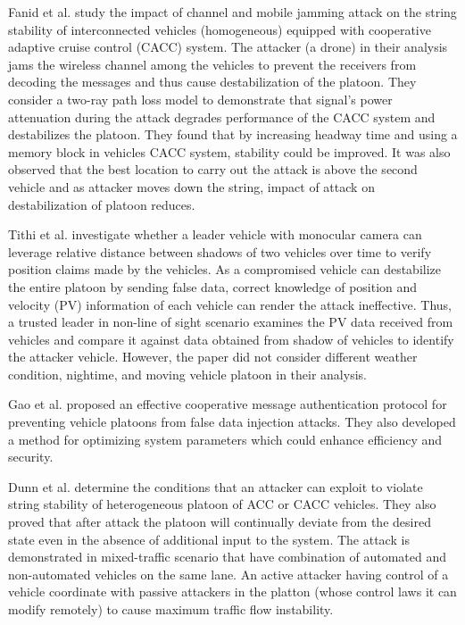 Fanid et al. \cite{FDZZ17} study the impact of channel and mobile jamming attack on the string stability of interconnected vehicles (homogeneous) equipped with  cooperative adaptive cruise control (CACC) system. The attacker (a drone) in their analysis jams the wireless channel among the vehicles to prevent the receivers from decoding the messages and thus cause destabilization of the platoon. They consider a two-ray path loss model to demonstrate that signal's power attenuation during the attack degrades performance of the CACC system and destabilizes the platoon. They found that by increasing headway time and using a memory block in vehicles CACC system, stability could be improved.  It was also observed that the best location to carry out the attack is above the second vehicle and as attacker moves down the string, impact of attack on destabilization of platoon reduces.  

Tithi et al. \cite{TWG17} investigate whether a leader vehicle with monocular camera can leverage relative distance between shadows of two vehicles over time to verify position claims made by the vehicles. As a compromised vehicle can destabilize the entire platoon by sending false data, correct knowledge of position and velocity (PV) information of each vehicle can render the attack ineffective. Thus, a trusted leader in non-line of sight scenario examines the PV data received from vehicles and compare it against data obtained from shadow of vehicles to identify the attacker vehicle. However, the paper did not consider different weather condition, nightime, and moving vehicle platoon in their analysis. 

Gao et al. \cite{GRZ16}  proposed an effective cooperative message authentication protocol for preventing vehicle platoons from false data injection attacks. They also developed a method for optimizing system parameters which could enhance efficiency and security. 

Dunn et al. \cite{DMSGSL17} determine the conditions that an attacker can exploit to violate string stability of heterogeneous platoon of ACC or CACC vehicles. They also proved that after attack the platoon will continually deviate from the desired state even in the absence of additional input to the system. The attack is demonstrated in mixed-traffic scenario that have combination of automated and non-automated vehicles on the same lane. An active attacker having control of a vehicle coordinate with passive attackers in the platton (whose control laws it can modify remotely) to cause maximum traffic flow instability. 


